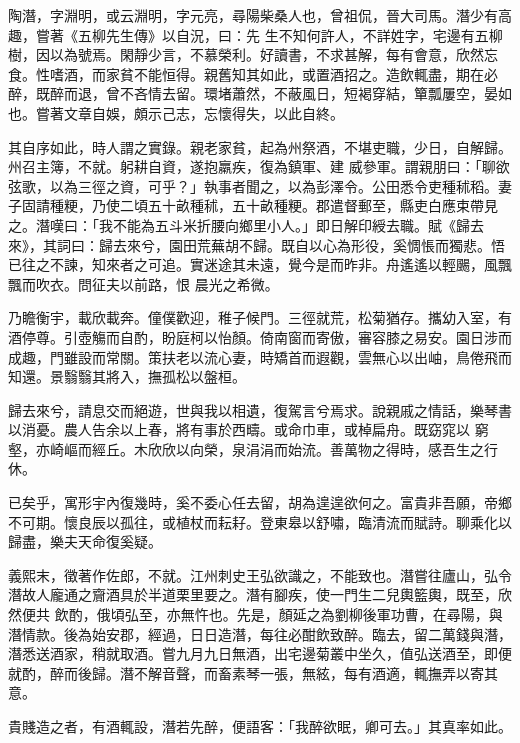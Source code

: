 \begin{pinyinscope}
 陶潛，字淵明，或云淵明，字元亮，尋陽柴桑人也，曾祖侃，晉大司馬。潛少有高趣，嘗著《五柳先生傳》以自況，曰：先
 生不知何許人，不詳姓字，宅邊有五柳樹，因以為號焉。閑靜少言，不慕榮利。好讀書，不求甚解，每有會意，欣然忘食。性嗜酒，而家貧不能恒得。親舊知其如此，或置酒招之。造飲輒盡，期在必醉，既醉而退，曾不吝情去留。環堵蕭然，不蔽風日，短褐穿結，簞瓢屢空，晏如也。嘗著文章自娛，頗示己志，忘懷得失，以此自終。



 其自序如此，時人謂之實錄。親老家貧，起為州祭酒，不堪吏職，少日，自解歸。州召主簿，不就。躬耕自資，遂抱羸疾，復為鎮軍、建
 威參軍。謂親朋曰：「聊欲弦歌，以為三徑之資，可乎？」執事者聞之，以為彭澤令。公田悉令吏種秫稻。妻子固請種粳，乃使二頃五十畝種秫，五十畝種粳。郡遣督郵至，縣吏白應束帶見之。潛嘆曰：「我不能為五斗米折腰向鄉里小人。」即日解印綬去職。賦《歸去來》，其詞曰：歸去來兮，園田荒蕪胡不歸。既自以心為形役，奚惆悵而獨悲。悟已往之不諫，知來者之可追。實迷途其未遠，覺今是而昨非。舟遙遙以輕颺，風飄飄而吹衣。問征夫以前路，恨
 晨光之希微。



 乃瞻衡宇，載欣載奔。僮僕歡迎，稚子候門。三徑就荒，松菊猶存。攜幼入室，有酒停尊。引壺觴而自酌，盼庭柯以怡顏。倚南窗而寄傲，審容膝之易安。園日涉而成趣，門雖設而常關。策扶老以流心妻，時矯首而遐觀，雲無心以出岫，鳥倦飛而知還。景翳翳其將入，撫孤松以盤桓。



 歸去來兮，請息交而絕遊，世與我以相遺，復駕言兮焉求。說親戚之情話，樂琴書以消憂。農人告余以上春，將有事於西疇。或命巾車，或棹扁舟。既窈窕以
 窮壑，亦崎嶇而經丘。木欣欣以向榮，泉涓涓而始流。善萬物之得時，感吾生之行休。



 已矣乎，寓形宇內復幾時，奚不委心任去留，胡為遑遑欲何之。富貴非吾願，帝鄉不可期。懷良辰以孤往，或植杖而耘耔。登東皋以舒嘯，臨清流而賦詩。聊乘化以歸盡，樂夫天命復奚疑。



 義熙末，徵著作佐郎，不就。江州刺史王弘欲識之，不能致也。潛嘗往廬山，弘令潛故人龐通之齎酒具於半道栗里要之。潛有腳疾，使一門生二兒輿籃輿，既至，欣然便共
 飲酌，俄頃弘至，亦無忤也。先是，顏延之為劉柳後軍功曹，在尋陽，與潛情款。後為始安郡，經過，日日造潛，每往必酣飲致醉。臨去，留二萬錢與潛，潛悉送酒家，稍就取酒。嘗九月九日無酒，出宅邊菊叢中坐久，值弘送酒至，即便就酌，醉而後歸。潛不解音聲，而畜素琴一張，無絃，每有酒適，輒撫弄以寄其意。



 貴賤造之者，有酒輒設，潛若先醉，便語客：「我醉欲眠，卿可去。」其真率如此。




\end{pinyinscope}

